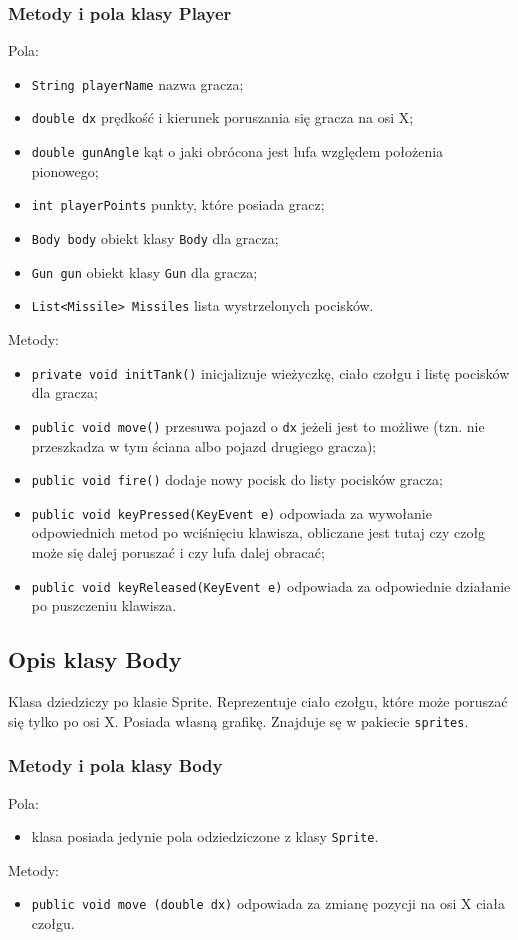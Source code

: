 \documentclass[12pt]{report}
\newcommand{\code}[1]{\texttt{#1}}
\begin{document}
\subsubsection{Metody i pola klasy Player}
Pola:
\begin{itemize}
    \item \code{String playerName} nazwa gracza;
    \item \code{double dx} prędkość i kierunek poruszania się gracza na osi X;
    \item \code{double gunAngle} kąt o jaki obrócona jest lufa względem położenia pionowego;
    \item \code{int playerPoints} punkty, które posiada gracz;
    \item \code{Body body} obiekt klasy \code{Body} dla gracza; 
    \item \code{Gun gun} obiekt klasy \code{Gun} dla gracza; 
    \item \code{List<Missile> Missiles} lista wystrzelonych pocisków.
\end{itemize}
Metody:
\begin{itemize}
        \item \code{private void initTank()} inicjalizuje wieżyczkę, ciało czołgu i listę pocisków dla gracza;
        \item \code{public void move()} przesuwa pojazd o \code{dx} jeżeli jest to możliwe (tzn. nie przeszkadza w tym ściana albo pojazd drugiego gracza);
        \item \code{public void fire()} dodaje nowy pocisk do listy pocisków gracza;
        \item \code{public void keyPressed(KeyEvent e)} odpowiada za wywołanie odpowiednich metod po wciśnięciu klawisza, obliczane jest tutaj czy czołg może się dalej poruszać i czy lufa dalej obracać;
        \item \code{public void keyReleased(KeyEvent e)} odpowiada za odpowiednie działanie po puszczeniu klawisza.
\end{itemize}



\subsection{Opis klasy Body}
Klasa dziedziczy po klasie Sprite. Reprezentuje ciało czołgu, które może poruszać się tylko po osi X. Posiada własną grafikę. Znajduje sę w pakiecie \code{sprites}. 
\subsubsection{Metody i pola klasy Body}
Pola:
\begin{itemize}
    \item klasa posiada jedynie pola odziedziczone z klasy \code{Sprite}.
\end{itemize}
Metody:
\begin{itemize}
    \item \code{public void move (double dx)} odpowiada za zmianę pozycji na osi X ciała czołgu.
\end{itemize}
\end{document}
